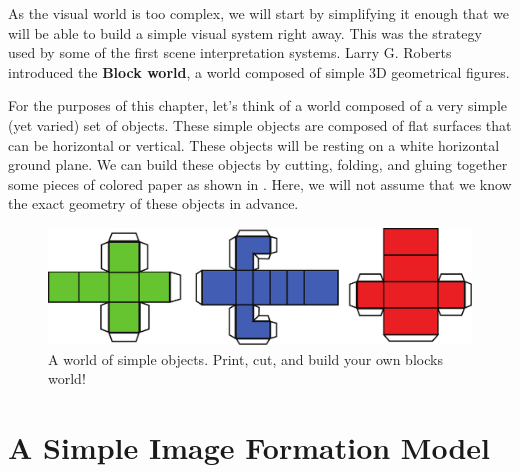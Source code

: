 As the visual world is too complex, we will start by simplifying it enough that we will be able to build a simple visual system right away. This was the strategy used by some of the first scene interpretation systems.  Larry G. Roberts \cite{Roberts63} introduced the {\bf Block world}, a world composed of simple 3D geometrical figures. 

For the purposes of this chapter, let's think of a world composed of a very simple (yet varied) set of objects. These simple objects are composed of flat surfaces that can be horizontal or vertical. These objects will be resting on a white horizontal ground plane. We can build these objects by cutting, folding, and gluing together some pieces of colored paper as shown in \fig{\ref{fig:simpleObjects}}. Here, we will not assume that we know the exact geometry of these objects in advance. 

\begin{figure}[t]
\centerline{
\includegraphics[width=1\linewidth]{figures/simplesystem/simpleObjects.pdf}
} 
\caption{A world of simple objects. Print, cut, and build your own blocks world!} 
\label{fig:simpleObjects}
\end{figure}



\section{A Simple Image Formation Model}

